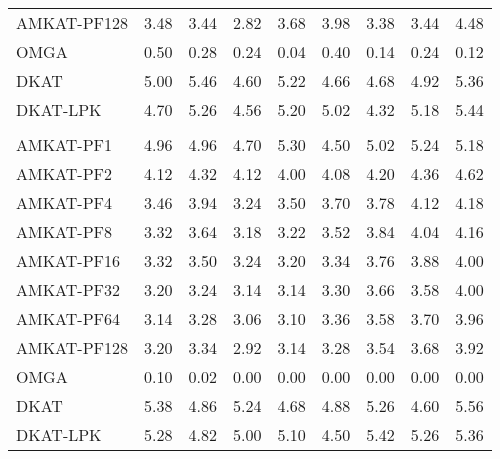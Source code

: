 \documentclass[a4paper,oneside,10pt]{article}\usepackage[]{graphicx}\usepackage[]{color}
\newenvironment{knitrout}{}{} %
\begin{document}
\begin{knitrout}
\begin{table}
\begin{tabular}[t]{lrrrrrrrr}
\hspace{1em}AMKAT-PF128 & 3.48 & 3.44 & 2.82 & 3.68 & 3.98 & 3.38 & 3.44 & 4.48\\
\hspace{1em}OMGA & 0.50 & 0.28 & 0.24 & 0.04 & 0.40 & 0.14 & 0.24 & 0.12\\
\hspace{1em}DKAT & 5.00 & 5.46 & 4.60 & 5.22 & 4.66 & 4.68 & 4.92 & 5.36\\
\hspace{1em}DKAT-LPK & 4.70 & 5.26 & 4.56 & 5.20 & 5.02 & 4.32 & 5.18 & 5.44\\
\addlinespace[0.3em]
\multicolumn{9}{l}{\textbf{Multivariate Cauchy errors}}\\
\hspace{1em}AMKAT-PF1 & 4.96 & 4.96 & 4.70 & 5.30 & 4.50 & 5.02 & 5.24 & 5.18\\
\hspace{1em}AMKAT-PF2 & 4.12 & 4.32 & 4.12 & 4.00 & 4.08 & 4.20 & 4.36 & 4.62\\
\hspace{1em}AMKAT-PF4 & 3.46 & 3.94 & 3.24 & 3.50 & 3.70 & 3.78 & 4.12 & 4.18\\
\hspace{1em}AMKAT-PF8 & 3.32 & 3.64 & 3.18 & 3.22 & 3.52 & 3.84 & 4.04 & 4.16\\
\hspace{1em}AMKAT-PF16 & 3.32 & 3.50 & 3.24 & 3.20 & 3.34 & 3.76 & 3.88 & 4.00\\
\hspace{1em}AMKAT-PF32 & 3.20 & 3.24 & 3.14 & 3.14 & 3.30 & 3.66 & 3.58 & 4.00\\
\hspace{1em}AMKAT-PF64 & 3.14 & 3.28 & 3.06 & 3.10 & 3.36 & 3.58 & 3.70 & 3.96\\
\hspace{1em}AMKAT-PF128 & 3.20 & 3.34 & 2.92 & 3.14 & 3.28 & 3.54 & 3.68 & 3.92\\
\hspace{1em}OMGA & 0.10 & 0.02 & 0.00 & 0.00 & 0.00 & 0.00 & 0.00 & 0.00\\
\hspace{1em}DKAT & 5.38 & 4.86 & 5.24 & 4.68 & 4.88 & 5.26 & 4.60 & 5.56\\
\hspace{1em}DKAT-LPK & 5.28 & 4.82 & 5.00 & 5.10 & 4.50 & 5.42 & 5.26 & 5.36\\
\bottomrule
\end{tabular}
\end{table}

\end{knitrout}
\end{document}
